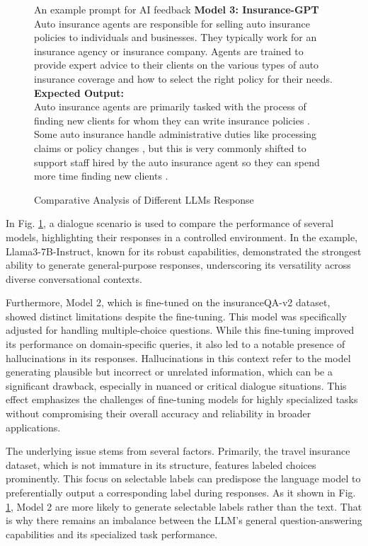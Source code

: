 \documentclass[conference]{IEEEtran}
\begin{document}
\begin{figure}[h]
\begin{AIbox}{An example prompt for AI feedback}
{\textbf{Model 3: Insurance-GPT}\\
Auto insurance agents are responsible for selling auto insurance policies to individuals and businesses. They typically work for an insurance agency or insurance company. Agents are trained to provide expert advice to their clients on the various types of auto insurance coverage and how to select the right policy for their needs.\\
}
\tcbline
{\bf Expected Output:} \\
{%
Auto insurance agents are primarily tasked with the process of finding new clients for whom they can write insurance policies . Some auto insurance handle administrative duties like processing claims or policy changes , but this is very commonly shifted to support staff hired by the auto insurance agent so they can spend more time finding new clients . 
}
\end{AIbox} 
\caption{Comparative Analysis of Different LLMs Response}
\label{prompt}
\end{figure}

In Fig. \ref{prompt}, a dialogue scenario is used to compare the performance of several models, highlighting their responses in a controlled environment. In the example, Llama3-7B-Instruct, known for its robust capabilities, demonstrated the strongest ability to generate general-purpose responses, underscoring its versatility across diverse conversational contexts.

Furthermore, Model 2, which is fine-tuned on the insuranceQA-v2 dataset, showed distinct limitations despite the fine-tuning. This model was specifically adjusted for handling multiple-choice questions. While this fine-tuning improved its performance on domain-specific queries, it also led to a notable presence of hallucinations in its responses. Hallucinations in this context refer to the model generating plausible but incorrect or unrelated information, which can be a significant drawback, especially in nuanced or critical dialogue situations. This effect emphasizes the challenges of fine-tuning models for highly specialized tasks without compromising their overall accuracy and reliability in broader applications.

The underlying issue stems from several factors. Primarily, the travel insurance dataset, which is not immature in its structure, features labeled choices prominently. This focus on selectable labels can predispose the language model to preferentially output a corresponding label during responses. As it shown in Fig. \ref{prompt}, Model 2 are more likely to generate selectable labels rather than the text. That is why there remains an imbalance between the LLM's general question-answering capabilities and its specialized task performance.
\end{document}
